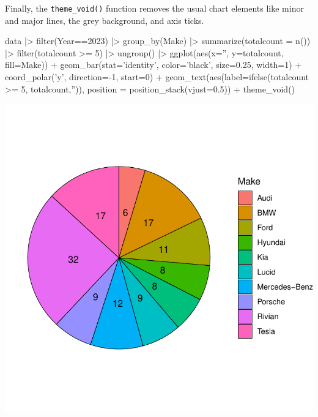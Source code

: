 Finally, the \texttt{theme\_void()} function removes the usual chart elements like minor and major lines, the grey background, and axis ticks. 

\begin{Rcode}
data |>
  filter(Year==2023) |>
  group_by(Make) |>
  summarize(totalcount = n()) |>
  filter(totalcount >= 5) |>
  ungroup() |>
  ggplot(aes(x='', y=totalcount, fill=Make)) +
    geom_bar(stat='identity', color='black', size=0.25, width=1) + 
    coord_polar('y', direction=-1, start=0) +
    geom_text(aes(label=ifelse(totalcount >= 5, totalcount,'')), 
                  position = position_stack(vjust=0.5)) +
    theme_void()
\end{Rcode}

\begin{center}
  \includegraphics[width=.5\textwidth]{fuel.pie.pdf}
\end{center}




     



